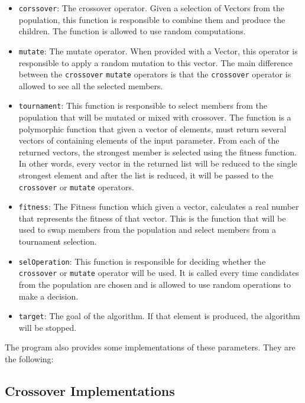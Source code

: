 \documentclass[10pt]{article}
\begin{document}
\begin{itemize}
\item \verb+corssover+: The crossover operator. Given a selection of Vectors from the population, this function is responsible to combine them and produce the children. The function is allowed to use random computations.
\item \verb+mutate+: The mutate operator. When provided with a Vector, this operator is responsible to apply a random mutation to this vector. The main difference between the \verb+crossover+ \verb+mutate+ operators is that the \verb+crossover+ operator is allowed to see all the selected members.
\item \verb+tournament+: This function is responsible to select members from the population that will be mutated or mixed with crossover. The function is a polymorphic function that given a vector of elements, must return several vectors of containing elements of the input parameter. From each of the returned vectors, the strongest member is selected using the fitness function. In other words, every vector in the returned list will be reduced to the single strongest element and after the list is reduced, it will be passed to the \verb+crossover+ or \verb+mutate+ operators.
\item \verb+fitness+: The Fitness function which given a vector, calculates a real number that represents the fitness of that vector. This is the function that will be used to swap members from the population and select members from a tournament selection.
\item \verb+selOperation+: This function is responsible for deciding whether the \verb+crossover+ or \verb+mutate+ operator will be used. It is called every time candidates from the population are chosen and is allowed to use random operations to make a decision.
\item \verb+target+: The goal of the algorithm. If that element is produced, the algorithm will be stopped.
\end{itemize} 

The program also provides some implementations of these parameters. They are the following:

\subsection{Crossover Implementations} 
\end{document}
